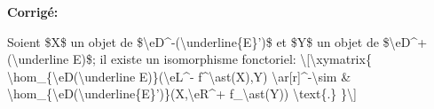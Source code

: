 \documentclass[oneside]{book}
\theoremstyle{sga-source}
\theoremstyle{sga-source-dash}
\theoremstyle{sga-source-dotdash}
\theoremstyle{sga-source-number-note-dash}
\theoremstyle{sga-source-note-number-dotdash}
\theoremstyle{sga-source-example-dotdash}
\theoremstyle{sga-source-inline-number}
\theoremstyle{sga-source-bare-number}
\theoremstyle{sga-source}
\begin{document}
\begin{description}
\par\noindent\textbf{Corrigé:} {\footnotesize\ttfamily\raggedright Soient \$X\$ un objet de \$\textbackslash{}\allowbreak{}eD\textasciicircum{}\allowbreak{}-\allowbreak{}(\allowbreak{}\textbackslash{}\allowbreak{}underline\{\allowbreak{}E\}\allowbreak{}')\allowbreak{}\$ et \$Y\$ un objet de  \$\textbackslash{}\allowbreak{}eD\textasciicircum{}\allowbreak{}+\allowbreak{}(\allowbreak{}\textbackslash{}\allowbreak{}underline E)\allowbreak{}\$; il existe un isomorphisme fonctoriel:  \textbackslash{}\allowbreak{}[\allowbreak{}\textbackslash{}\allowbreak{}xymatrix\{\allowbreak{}   \textbackslash{}\allowbreak{}hom\_\allowbreak{}\{\allowbreak{}\textbackslash{}\allowbreak{}eD(\allowbreak{}\textbackslash{}\allowbreak{}underline E)\allowbreak{}\}\allowbreak{}(\allowbreak{}\textbackslash{}\allowbreak{}eL\textasciicircum{}\allowbreak{}-\allowbreak{} f\textasciicircum{}\allowbreak{}\textbackslash{}\allowbreak{}ast(\allowbreak{}X)\allowbreak{},\allowbreak{}Y)\allowbreak{} \textbackslash{}\allowbreak{}ar[\allowbreak{}r]\allowbreak{}\textasciicircum{}\allowbreak{}-\allowbreak{}\textbackslash{}\allowbreak{}sim      \& \textbackslash{}\allowbreak{}hom\_\allowbreak{}\{\allowbreak{}\textbackslash{}\allowbreak{}eD(\allowbreak{}\textbackslash{}\allowbreak{}underline\{\allowbreak{}E\}\allowbreak{}')\allowbreak{}\}\allowbreak{}(\allowbreak{}X,\allowbreak{}\textbackslash{}\allowbreak{}eR\textasciicircum{}\allowbreak{}+\allowbreak{} f\_\allowbreak{}\textbackslash{}\allowbreak{}ast(\allowbreak{}Y)\allowbreak{})\allowbreak{} \textbackslash{}\allowbreak{}text\{\allowbreak{}.\}\allowbreak{} \}\allowbreak{}\textbackslash{}\allowbreak{}]\allowbreak{}\par}
\smallskip
\end{description}
\endgroup
\fi
\end{document}
